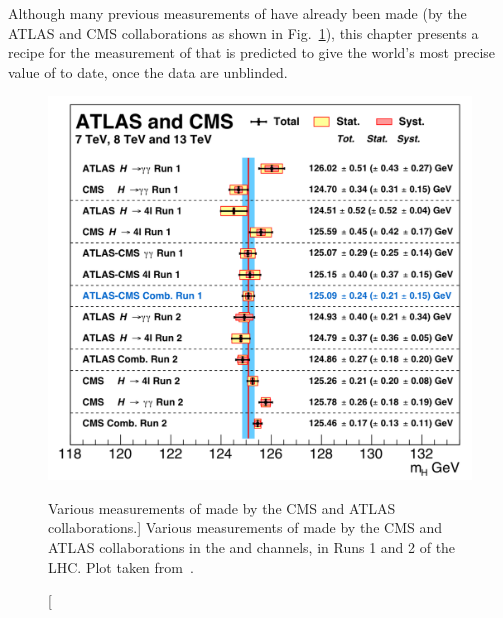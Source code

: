Although many previous measurements of \mH have already been made (\eg by the ATLAS and CMS collaborations as shown in Fig.~\ref{fig:atlas_cms_mH_meas}), this chapter presents a recipe for the measurement of \mH that is predicted to give the world's most precise value of \mH to date, once the data are unblinded.
\begin{figure}[hbtp]
    \centering
    \includegraphics[width=\textwidth,keepaspectratio]{figures/higgsmassmeas/all_mH_measurements_atlas_cms.png}
        \caption
        [Various measurements of \mH made by the CMS and ATLAS collaborations.]
        {Various measurements of \mH made by the CMS and ATLAS collaborations in the \htoyy and \hzzfourl channels, in Runs 1 and 2 of the LHC.
        Plot taken from~\cite{particle_data_group_review_2020}.
        }
        \label{fig:atlas_cms_mH_meas}
\end{figure}
